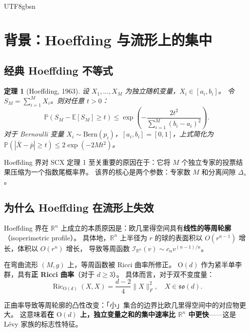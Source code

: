 \documentclass[12pt,a4paper]{article}
\theoremstyle{plain}
\newtheorem{theorem}{定理}[section]
\theoremstyle{definition}
\theoremstyle{remark}
\newcommand{\R}{\mathbb{R}}
\newcommand{\E}{\mathbb{E}}
\newcommand{\Pbb}{\mathbb{P}}
\newcommand{\Od}{\mathrm{O}(d)}
\newcommand{\sod}{\mathfrak{so}(d)}
\DeclareMathOperator{\Ric}{Ric}
\begin{document}
\begin{CJK}{UTF8}{gbsn}
\newpage

\section{背景：Hoeffding 与流形上的集中}

\subsection{经典 Hoeffding 不等式}

\begin{theorem}[Hoeffding, 1963]\label{thm:hoeffding}
设 $X_1, \ldots, X_M$ 为独立随机变量，$X_i \in [a_i, b_i]$。
令 $S_M = \sum_{i=1}^M X_i$。则对任意 $t > 0$：
\begin{equation}
    \Pbb(S_M - \E[S_M] \geq t) \leq \exp\!\left(-\frac{2t^2}{\sum_{i=1}^M (b_i - a_i)^2}\right).
\end{equation}
对于 Bernoulli 变量 $X_i \sim \mathrm{Bern}(p_i)$，$[a_i, b_i] = [0, 1]$，上式简化为
$\Pbb(|\bar{X} - \bar{p}| \geq t) \leq 2\exp(-2M t^2)$。
\end{theorem}

Hoeffding 界对 SCX 定理 1 至关重要的原因在于：它将 $M$ 个独立专家的投票结果压缩为一个指数尾概率界。
该界的核心是两个参数：专家数 $M$ 和分离间隙 $\Delta_s$。

\subsection{为什么 Hoeffding 在流形上失效}

Hoeffding 界在 $\R^n$ 上成立的本质原因是：欧几里得空间具有\textbf{线性的等周轮廓}（isoperimetric profile）。
具体地，$\R^n$ 上半径为 $r$ 的球的表面积以 $O(r^{n-1})$ 增长，体积以 $O(r^n)$ 增长，
导致等周函数 $\mathcal{I}_{\R^n}(v) \sim c_n v^{(n-1)/n}$。

在弯曲流形 $(M, g)$ 上，等周函数被 Ricci 曲率所修正。
$\Od$ 作为紧半单李群，具有\textbf{正 Ricci 曲率}（对于 $d \geq 3$）。
具体而言，对于双不变度量：
\begin{equation}\label{eq:ricci_od}
    \Ric_{\Od}(X, X) = \frac{d-2}{4}\|X\|_F^2, \quad X \in \sod.
\end{equation}

正曲率导致等周轮廓的凸性改变：「小」集合的边界比欧几里得空间中的对应物更大。
这意味着\textbf{在 $\Od$ 上，独立变量之和的集中速率比 $\R^n$ 中更快}——这是 Lévy 家族的标志性特征。


\end{CJK}
\end{document}
